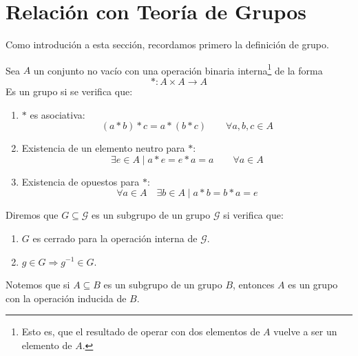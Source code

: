 \section{Relación con Teoría de Grupos}
Como introdución a esta sección, recordamos primero la definición de grupo.
\begin{definicion}[Grupo]
    Sea $A$ un conjunto no vacío con una operación binaria interna\footnote{Esto es, que el resultado de operar con dos elementos de $A$ vuelve a ser un elemento de $A$.} de la forma
\begin{equation*}
    \ast:A\times A\rightarrow A
\end{equation*}
Es un grupo si se verifica que:
\begin{enumerate}[label=(\arabic*)]
    \item $\ast$ es asociativa: 
        \begin{equation*}
            (a\ast b)\ast c = a\ast (b\ast c) \qquad \forall a,b,c\in A
        \end{equation*}
    \item Existencia de un elemento neutro para $\ast$:
        \begin{equation*}
            \exists e\in A \mid a\ast e = e\ast a = a \qquad \forall a\in A
        \end{equation*}
    \item Existencia de opuestos para $\ast$:
        \begin{equation*}
            \forall a\in A \quad \exists b\in A \mid a\ast b = b\ast a = e
        \end{equation*}
\end{enumerate}
\end{definicion}

\begin{definicion}
    Diremos que $G\subseteq  \mathcal{G}$ es un subgrupo de un grupo $\mathcal{G}$ si verifica que:
    \begin{enumerate}
        \item $G$ es cerrado para la operación interna de $\mathcal{G}$.
        \item $g\in G \Longrightarrow g^{-1} \in G$.
    \end{enumerate}
\end{definicion}
\begin{observacion}
    Notemos que si $A\subseteq B$ es un subgrupo de un grupo $B$, entonces $A$ es un grupo con la operación inducida de $B$.
\end{observacion}

